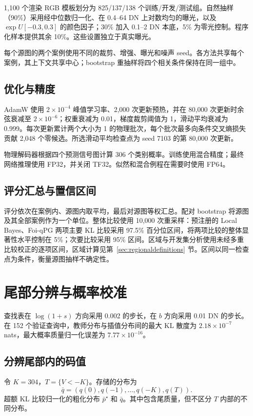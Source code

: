 \documentclass[10pt,twocolumn,journal]{IEEEtran}
\begin{document}
1,100 个渲染 RGB 模板划分为 825/137/138 个训练/开发/测试组。自然抽样（90\%）采用经中位数归一化、在 0.4--64 DN 上对数均匀的曝光，以及 $\exp U[-0.3,0.3]$ 的颜色因子；30\% 加入 0.1--2 DN 本底，5\% 为零光控制。程序化样本提供其余 10\%。这些设置独立于真实曝光。

每个源图的两个案例使用不同的裁剪、增强、曝光和噪声 seed。各方法共享每个案例，其上下文共享中心；bootstrap 重抽样将四个相关条件保持在同一组中。

\subsection{优化与精度}
AdamW 使用 $2\times10^{-4}$ 峰值学习率、2,000 次更新预热，并在 80,000 次更新时余弦衰减至 $2\times10^{-6}$；权重衰减为 0.01，梯度裁剪阈值为 1，滑动平均衰减为 0.999。每次更新累计两个大小为 1 的物理批次，每个批次最多向条件交叉熵损失贡献 2,048 个零候选。所选滑动平均检查点为 seed 7103 的第 80,000 次更新。

物理解码器根据四个预测信号图计算 306 个类别概率。训练使用混合精度；最终网络推理使用 FP32，并关闭 TF32。似然和混合例程在需要时使用 FP64。

\subsection{评分汇总与置信区间}\label{sec:scoreaggregation}
评分依次在案例内、源图内取平均，最后对源图等权汇总。配对 bootstrap 将源图及其全部案例作为一个单位。整体比较使用 10,000 次重采样：预注册的 Local Bayes、Foi-qPG 两项主要 KL 比较采用 97.5\% 百分位区间，将两项比较的整体显著性水平控制在 5\%；次要比较采用 95\% 区间。区域与开发集分析使用未经多重比较校正的逐项区间，区域计算见第~\ref{sec:regionaldefinitions} 节。区间以同一检查点为条件，衡量源图抽样不确定性。

\section{尾部分辨与概率校准}
查找表在 $\log(1+s)$ 方向采用 0.002 的步长，在 $b$ 方向采用 0.01 DN 的步长。在 152 个验证查询中，教师分布与插值分布间的最大 KL 散度为 $2.18\times10^{-7}$ nats，最大概率质量归一化误差为 $7.77\times10^{-16}$。

\subsection{分辨尾部内的码值}
令 $K=304$，$T=\{V<-K\}$。存储的分布为
\begin{equation}
\bar q=(q(0),q(-1),\ldots,q(-K),q(T)).
\end{equation}
超额 KL 比较归一化的粗化分布 $\bar p^\star$ 和 $\bar q$。其中包含尾质量，但不区分 $T$ 内部的不同分布。
\end{document}
